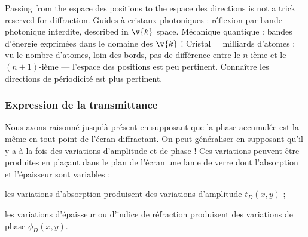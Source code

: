 \begin{figure}[h!]
  \centering
\end{figure}

\begin{remark}
  Passing from the espace des positions to the espace des directions is not a
  trick reserved for diffraction. Guides à cristaux photoniques : réflexion par
  bande photonique interdite, described in $\v{k}$ space. Mécanique quantique :
  bandes d'énergie exprimées dans le domaine des $\v{k}$ ! Cristal = milliards
  d'atomes : vu le nombre d'atomes, loin des bords, pas de différence entre le
  $n$-ième et le $(n{+}1)$-ième --- l'espace des positions est peu pertinent.
  Connaître les directions de périodicité est plus pertinent.
\end{remark}

\subsubsection{Expression de la transmittance}
Nous avons raisonné jusqu'à présent en supposant que la phase accumulée est la
même en tout point de l'écran diffractant. On peut généraliser en supposant
qu'il y a à la fois des variations d'amplitude et de phase ! Ces variations
peuvent être produites en plaçant dans le plan de l'écran une lame de verre dont
l'absorption et l'épaisseur sont variables :
\begin{subpart}
  \item les variations d'absorption produisent des variations d'amplitude
    $t_D(x,y)$ ;
  \item les variations d'épaisseur ou d'indice de réfraction produisent des
    variations de phase $\phi_D(x,y)$.
\end{subpart}

